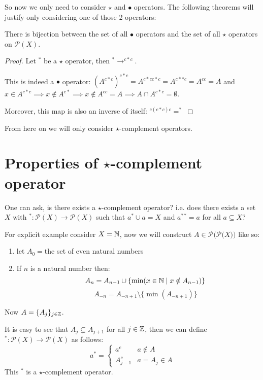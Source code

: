 	So now we only need to consider $\star$ and $\bullet$ operators. The following theorems will justify only considering one of those 2 operators:
	
	\begin{theorem}\label{thm:1.2}
		There is bijection between the set of all $\bullet$ operators and the set of all $\star$ operators on $\mathcal{P}(X)$.
	\end{theorem}
	\begin{proof}
		Let $^*$ be a $\star$ operator, then $^*\to^{c*c}$.
		
		
		This is indeed a $\bullet$ operator: $(A^{c*c})^{c*c}=A^{c*cc*c}=A^{c**c}=A^{cc}=A$ and $x\in A^{c*c}\implies x \notin A^{c*}\implies x \notin A^{cc}=A\implies A\cap A^{c*c}=\emptyset$.
		
		Moreover, this map is also an inverse of itself: $^{c(c*c)c}=^*$
	\end{proof}
	From here on we will only consider $\star$-complement operators.
	
	\section{Properties of $\star$-complement operator}
	One can ask, is there exists a $\star$-complement operator? i.e. does there exists a set $X$ with $^*:\mathcal{P}(X)\to\mathcal{P}(X)$ such that $a^*\cup a=X$ and $a^*{}^*=a$ for all $a\subseteq X$?
	
	For explicit example consider $X=\Bbb{N}$, now we will construct $A\in \mathcal{P(P(}X))$ like so: 
	\begin{enumerate}
		\item{let $A_0=$the set of even natural numbers}
		\item{If $n$ is a natural number then:}
		$$\qquad A_{n}=A_{n-1}\cup\{\min(x\in\Bbb{N}\mid x\notin A_{n-1})\}$$
		$$\qquad A_{-n}=A_{-n+1}\setminus\{\min(A_{-n+1})\}$$
	\end{enumerate}
	Now $A=\{A_j\}_{j\in\Bbb{Z}}$.
	
	It is easy to see that $A_j\subsetneq A_{j+1}$ for all $j\in\Bbb{Z}$, then we can define $^*:\mathcal{P}(X)\to\mathcal{P}(X)$ as follows:
	$$a^*=\begin{cases}a^c&a\notin A\\A_{j-1}^c&a=A_j\in A\end{cases}$$
	This $^*$ is a $\star$-complement operator.
	
